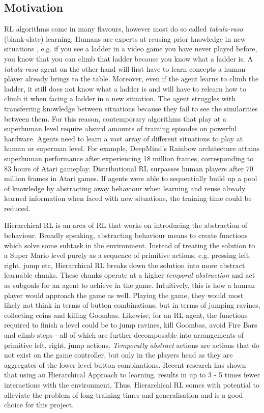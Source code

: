 \documentclass[notitlepage,a4paper,11pt]{article}
\begin{document}
\subsection{Motivation}
RL algorithms come in many flavours, however most do so called \textit{tabula-rasa} (blank-slate) learning. Humans are experts at reusing prior knowledge in new situations \cite{dubey2018investigating}, e.g. if you see a ladder in a video game you have never played before, you know that you can climb that ladder because you know what a ladder is. A \textit{tabula-rasa} agent on the other hand will first have to learn concepts a human player already brings to the table. Moreover, even if the agent learns to climb the ladder, it still does not know what a ladder is and will have to relearn how to climb it when facing a ladder in a new situation. The agent struggles with transferring knowledge between situations because they fail to see the similarities between them. For this reason, contemporary algorithms that play at a superhuman level require absurd amounts of training episodes on powerful hardware. Agents need to learn a vast array of different situations to play at human or superman level. For example, DeepMind's Rainbow architecture \cite{hessel2018rainbow} attains superhuman performance after experiencing 18 million frames, corresponding to 83 hours of Atari gameplay. Distributional RL \cite{bellemare2017distributional} surpasses human players after 70 million frames in Atari games. If agents were able to sequentially build up a pool of knowledge by abstracting away behaviour when learning and reuse already learned information when faced with new situations, the training time could be reduced. 

Hierarchical RL is an area of RL that works on introducing the abstraction of behaviour. Broadly speaking, abstracting behaviour means to create functions which solve some subtask in the environment. Instead of treating the solution to a Super Mario level purely as a sequence of primitive actions, e.g. pressing left, right, jump etc, Hierarchical RL breaks down the solution into more abstract learnable chunks. These chunks operate at a higher \textit{temporal abstraction} and act as subgoals for an agent to achieve in the game. Intuitively, this is how a human player would approach the game as well. Playing the game, they would most likely not think in terms of button combinations, but in terms of jumping ravines, collecting coins and killing Goombas. Likewise, for an RL-agent, the functions required to finish a level could be to jump ravines, kill Goombas, avoid Fire Bars and climb steps - all of which are further decomposable into arrangements of primitive left, right, jump actions. \textit{Temporally abstract} actions are actions that do not exist on the game controller, but only in the players head as they are aggregates of the lower level button combinations. Recent research \cite{nachum2019does} has shown that using an Hierarchical Approach to learning, results in up to 3 - 5 times fewer interactions with the environment. Thus, Hierarchical RL comes with potential to alleviate the problem of long training times and generalisation and is a good choice for this project. 
\end{document}
